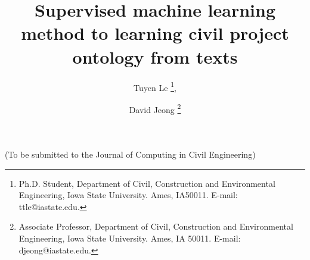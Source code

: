 \documentclass[NewProceedings, InsideFigs]{ascelike} %
\begin{document}
% 
\title{Supervised machine learning method to learning civil project ontology from texts}
%
\author{
Tuyen Le
\thanks{
Ph.D. Student, Department of Civil, Construction and Environmental Engineering, Iowa State University. Ames, IA50011. E-mail: ttle@iastate.edu.},
\and
David Jeong%
\thanks{Associate Professor, Department of Civil, Construction and Environmental Engineering, Iowa State University. Ames, IA 50011. E-mail: djeong@iastate.edu.}
 }
 
\maketitle
%
\begin{center}
(To be submitted to the Journal of Computing in Civil Engineering) 
\end{center}
%
\begin{abstract} %
 
\end{abstract}
%
%






\end{document}
